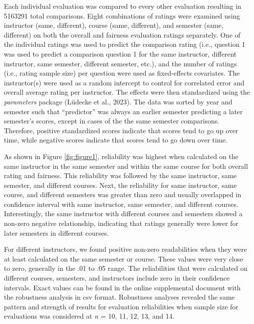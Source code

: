 \documentclass[
  man]{apa7}
\begin{document}
Each individual evaluation was compared to every other evaluation
resulting in 5163291 total comparisons. Eight combinations of
ratings were examined using instructor (same, different), course (same,
different), and semester (same, different) on both the overall and
fairness evaluation ratings separately. One of the individual ratings
was used to predict the comparison rating (i.e., question 1 was used to
predict a comparison question 1 for the same instructor, different
instructor, same semester, different semester, etc.), and the number of
ratings (i.e., rating sample size) per question were used as
fixed-effects covariates. The instructor(s) were used as a random
intercept to control for correlated error and overall average rating per
instructor. The effects were then standardized using the \emph{parameters}
package (Lüdecke et al., 2023). The data was sorted by year and semester such
that ``predictor'' was always an earlier semester predicting a later
semester's scores, except in cases of the the same semester comparisons.
Therefore, positive standardized scores indicate that scores tend to go
up over time, while negative scores indicate that scores tend to go down
over time.

As shown in Figure \ref{fig:figure1}, reliability was highest when
calculated on the same instructor in the same semester and within the
same course for both overall rating and fairness. This reliability was
followed by the same instructor, same semester, and different courses.
Next, the reliability for same instructor, same course, and different
semesters was greater than zero and usually overlapped in confidence
interval with same instructor, same semester, and different courses.
Interestingly, the same instructor with different courses and semesters
showed a non-zero negative relationship, indicating that ratings
generally were lower for later semesters in different courses.

For different instructors, we found positive non-zero readabilities when
they were at least calculated on the same semester or course. These
values were very close to zero, generally in the .01 to .05 range. The
reliabilities that were calculated on different courses, semesters, and
instructors include zero in their confidence intervals. Exact values can
be found in the online supplemental document with the robustness
analysis in csv format. Robustness analyses revealed the same pattern
and strength of results for evaluation reliabilities when sample size
for evaluations was considered at \emph{n} = 10, 11, 12, 13, and 14.
\end{document}
